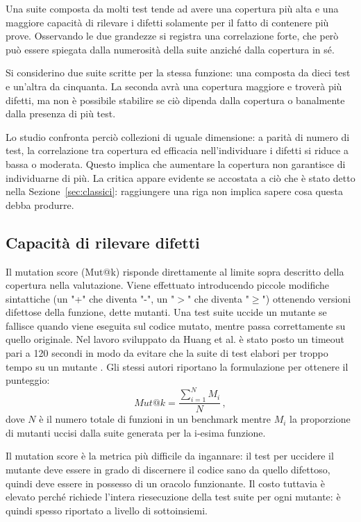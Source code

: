 Una suite composta da molti test tende ad avere una copertura più alta e una maggiore capacità di rilevare i difetti solamente per il fatto di contenere più prove. Osservando le due grandezze si registra una correlazione forte, che però può essere spiegata dalla numerosità della suite anziché dalla copertura in sé.

Si considerino due suite scritte per la stessa funzione: una composta da dieci test e un'altra da cinquanta. La seconda avrà una copertura maggiore e troverà più difetti, ma non è possibile stabilire se ciò dipenda dalla copertura o banalmente dalla presenza di più test.

Lo studio confronta perciò collezioni di uguale dimensione: a parità di numero di test, la correlazione tra copertura ed efficacia nell'individuare i difetti si riduce a bassa o moderata. Questo implica che aumentare la copertura non garantisce di individuarne di più. 
La critica appare evidente se accostata a ciò che è stato detto nella Sezione~\ref{sec:classici}: raggiungere una riga non implica sapere cosa questa debba produrre.


\subsection{Capacità di rilevare difetti}
Il mutation score (Mut@k) risponde direttamente al limite sopra descritto della copertura nella valutazione. Viene effettuato introducendo piccole modifiche sintattiche (un "+" che diventa "-", un "$>$" che diventa "$\geq$") ottenendo versioni difettose della funzione, dette mutanti. Una test suite uccide un mutante se fallisce quando viene eseguita sul codice mutato, mentre passa correttamente su quello originale. Nel lavoro sviluppato da Huang et al. è stato posto un timeout pari a 120 secondi in modo da evitare che la suite di test elabori per troppo tempo su un mutante \cite{huang2025ult}. Gli stessi autori riportano la formulazione per ottenere il punteggio: \begin{equation}
Mut@k = \frac{\sum_{i=1}^{N} M_i}{N} \, ,
\label{eq:mutk}
\end{equation} 
dove $N$ è il numero totale di funzioni in un benchmark mentre $M_i$ la proporzione di mutanti uccisi dalla suite generata per la i-esima funzione.

Il mutation score è la metrica più difficile da ingannare: il test per uccidere il mutante deve essere in grado di discernere il codice sano da quello difettoso, quindi deve essere in possesso di un oracolo funzionante. Il costo tuttavia è elevato perché richiede l'intera riesecuzione della test suite per ogni mutante: è quindi spesso riportato a livello di sottoinsiemi.



